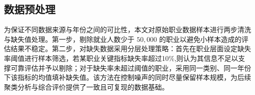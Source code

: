 \documentclass{mcmthesis}
\begin{document}
\subsection{数据预处理}
\noindent 
为保证不同数据来源与年份之间的可比性，本文对原始职业数据样本进行两步清洗与缺失值处理。第一步，剔除就业人数少于 $50{,}000$ 的职业以避免小样本造成的评估结果不稳定。第二步，对缺失数据采用分层处理策略：首先在职业层面设定缺失率阈值进行样本筛选，若某职业关键指标缺失率超过10\%,则认为其信息不足以支撑可靠评估并予以剔除；对于缺失率未超过阈值的职业，采用同一类别、同一年份下该指标的均值填补缺失值。该方法在控制噪声的同时尽量保留样本规模，为后续聚类分析与综合评价提供了一致且可复现的数据基础。










\end{document}
